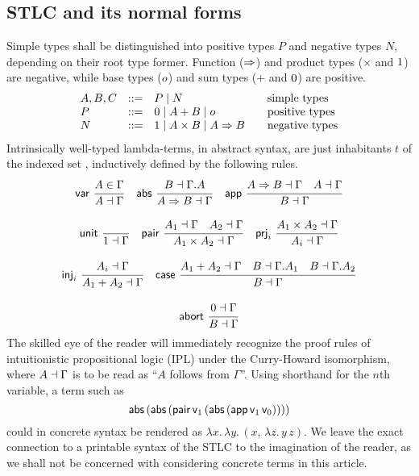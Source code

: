 \documentclass[sigplan,screen]{acmart}
\begin{document}
\subsection{STLC and its normal forms}

Simple types shall be distinguished into positive types $P$ and
negative types $N$, depending on their root type former.  Function
($\Rightarrow$) and product types ($\times$ and $1$) are negative,
while base types ($o$) and sum types ($+$ and $0$) are positive.
\[
\begin{array}{lrl@{\qquad}l}
  A,B,C & ::= & P \mid N & \mbox{simple types} \\
  P     & ::= & \tyzero \mid A + B \mid \tybase & \mbox{positive types} \\
  N     & ::= & \tyone \mid A \times B \mid A \To B
    & \mbox{negative types} \\
\end{array}
\]
Intrinsically well-typed lambda-terms, in abstract syntax,
are just inhabitants $t$ of the indexed set ,
inductively defined by the following rules.
\begin{gather*}
  \nru{\tvar}{A \in \Gamma}{A \from \Gamma}
\quad
  \nru{\tabs}{B \from \cext \Gamma A}{A \To B \from \Gamma}
\quad
  \nru{\tapp}
    {A \To B \from \Gamma \quad A \from \Gamma}
    {B \from \Gamma}
\\[2ex]
  \nru{\tunit}{}{\tyone \from \Gamma}
\quad
  \nru{\tpair}
    {A_1 \from \Gamma \quad A_2 \from \Gamma}
    {A_1 \times A_2 \from \Gamma}
\quad
  \nru{\tprj_i}
    {A_1 \times A_2 \from \Gamma}
    {A_i \from \Gamma}
\\[2ex]
  \nru{\tinj_i}
    {A_i \from \Gamma}
    {A_1 + A_2 \from \Gamma}
\quad
  \nru{\tcase}
    {A_1 + A_2 \from \Gamma
      \quad B \from \cext \Gamma A_1
      \quad B \from \cext \Gamma A_2
    }{B \from \Gamma}
\\[2ex]
  \nru{\tabort}
    {\tyzero \from \Gamma}
    {B \from \Gamma}
\end{gather*}
The skilled eye of the reader will immediately recognize the proof
rules of intuitionistic propositional logic (IPL) under the
Curry-Howard isomorphism, where $A \dashv \Gamma$ is to be read as
``$A$ follows from $\Gamma$''.  Using shorthand
 for the $n$th variable,
a term such as
\[
  \mathsf{abs}\,(\mathsf{abs}\,(\mathsf{pair}\,
    \mathsf{v}_{1}\,
    (\mathsf{abs}\,(\mathsf{app}\,\mathsf{v}_{1}\,\mathsf{v}_{0}))))
\]
could in concrete syntax be rendered as
\(
  \lambda x.\,\lambda y.\,(x,\,\lambda z.\,y\,z)
  .
\)
We leave the exact connection to a printable
syntax of the STLC to the imagination of the reader,
as we shall not be concerned with considering
concrete terms in this article.
\end{document}
